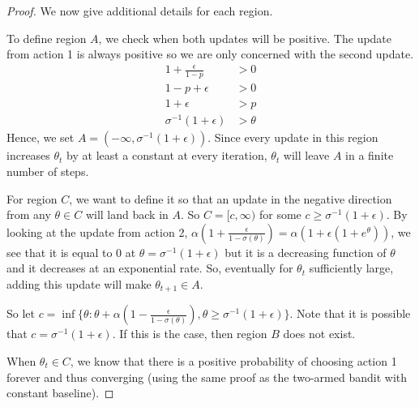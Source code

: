 \begin{proof}
We now give additional details for each region.

To define region $A$, we check when both updates will be positive. The update from action 1 is always positive so we are only concerned with the second update. 
\begin{align*}
    1 + \frac{\epsilon}{1-p} &> 0 \\
    1 - p + \epsilon &> 0 \\
    1 + \epsilon &> p \\
    \sigma^{-1} (1+\epsilon) &> \theta
\end{align*}
Hence, we set $A = (-\infty, \sigma^{-1} (1+\epsilon))$.
Since every update in this region increases $\theta_t$ by at least a constant at every iteration, $\theta_t$ will leave $A$ in a finite number of steps.

For region $C$, we want to define it so that an update in the negative direction from any $\theta \in C$ will land back in $A$. So $C = [c, \infty)$ for some $c \ge \sigma^{-1} (1+\epsilon)$. 
By looking at the update from action 2, $\alpha(1 + \frac{\epsilon}{1-\sigma(\theta)})= \alpha(1 + \epsilon(1+e^\theta)) $, we see that it is equal to 0 at $\theta = \sigma^{-1} (1+\epsilon)$ but it is a decreasing function of $\theta$ and it decreases at an exponential rate. So, eventually for $\theta_t$ sufficiently large, adding this update will make $\theta_{t+1} \in A$.

So let $c = \inf \{\theta: \theta + \alpha \left( 1 - \frac{\epsilon}{1 - \sigma(\theta)} \right), \theta \ge \sigma^{-1} (1+\epsilon) \} $. 
Note that it is possible that $c = \sigma^{-1} (1+\epsilon)$. If this is the case, then region $B$ does not exist.

When $\theta_t \in C$, we know that there is a positive probability of choosing action 1 forever and thus converging (using the same proof as the two-armed bandit with constant baseline).






\end{proof}
